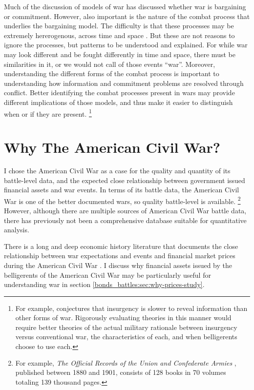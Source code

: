 Much of the discussion of models of war has discussed whether war is bargaining or commitment.
However, also important is the nature of the combat process that underlies the bargaining model. %
The difficulty is that these processes may be extremely hererogenous, across time and space \parencite{Reiter2003}.
But these are not reasons to ignore the processes, but patterns to be understood and explained. %
For while war may look different and be fought differently in time and
space, there must be similarities in it, or we would not call of those events ``war''. %
Moreover, understanding the different forms of the combat process is important to understanding how information and commitment problems are resolved through conflict. %
Better identifying the combat processes present in wars may provide different implications of those models, and thus make it easier to
distinguish when or if they are present.%
\footnote{%
  For example, \textcite{Walter2009} conjectures that insurgency is slower to reveal information than other forms of war. %
  Rigorously evaluating theories in this manner would require better theories of the actual military rationale between insurgency versus conventional war, the characteristics of each, and when belligerents choose to use each.
} %



\section{Why The American Civil War?}
\label{bonds_battles:sec:why-american-civil}

I chose the American Civil War as a case for the quality and quantity of its battle-level data, and the expected close relationship between government issued financial assets and war events.
In terms of its battle data, the American Civil War is one of the better documented wars, so quality battle-level is available.%
\footnote{%
  For example, \textit{The Official Records of the Union and  Confederate Armies} \parencites{US1901}, published between 1880 and 1901, consists of 128 books in 70 volumes totaling 139 thousand pages. %
} %
However, although there are multiple sources of American Civil War battle data, there has previously not been a comprehensive database suitable for quantitative analysis.

There is a long and deep economic history literature that documents the close relationship between war expectations and events and financial market prices during the American Civil War \parencites{Mitchell1903}{Mitchell1908}{Calomiris1988}{WillardGuinnaneEtAl1996}{McCandless1996}{SmithSmith1997}{Schwab1901}{Weidenmier2002}{BurdekinLangdana1993}{DavisPecquet1990}{BrownBurdekin2000}{OosterlinckWeidenmier2007}{Roll1972}.
I discuss why financial assets issued by the belligerents of the American Civil War may be particularly useful for understanding war in section \ref{bonds_battles:sec:why-prices-study}.

